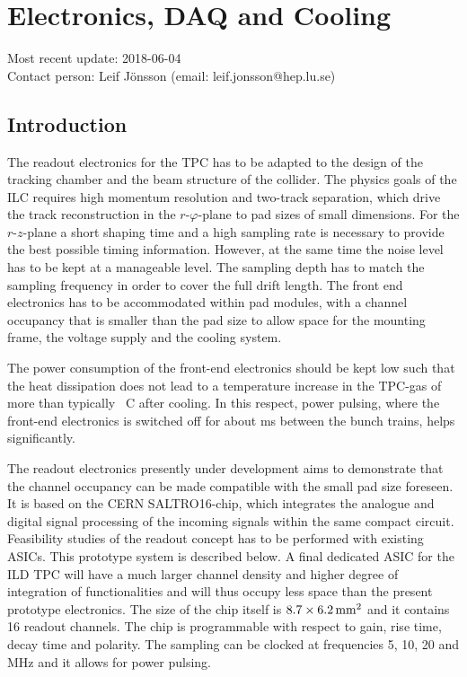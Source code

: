 \section{Electronics, DAQ and Cooling}\label{chap:TPC_sec:electronics}
Most recent update: 2018-06-04 \\
Contact person: Leif J{\"o}nsson (email: leif.jonsson@hep.lu.se)

\subsection{Introduction}
The readout electronics for the TPC has to be adapted to the design of the tracking chamber and the beam structure of the collider. The physics goals of the ILC requires high momentum resolution and two-track separation, which drive the track reconstruction in the $r\text{-}\varphi$-plane to pad sizes of small dimensions. For the $r\text{-}z$-plane a short shaping time and a high sampling rate is necessary to provide the best possible timing information. However, at the same time the noise level has to be kept at a manageable level. The sampling depth has to match the sampling frequency in order to cover the full drift length. The front end electronics has to be accommodated within pad modules, with a channel occupancy that is smaller than the pad size to allow space for the mounting frame, the voltage supply and the cooling system.

The power consumption of the front-end electronics should be kept low such that the heat dissipation does not lead to a temperature increase in the TPC-gas of more than typically \unit[1]{\textdegree C} after cooling. In this respect, power pulsing, where the front-end electronics is switched off for about \unit[199]{ms} between the bunch trains, helps significantly.

The readout electronics presently under development aims to demonstrate that the channel occupancy can be made compatible with the small pad size foreseen. It is based on the CERN SALTRO16-chip, which integrates the analogue and digital signal processing of the incoming signals within the same compact circuit. Feasibility studies of the readout concept has to be performed with existing ASICs. This prototype system is described below. A final dedicated ASIC for the ILD TPC will have a much larger channel density and higher degree of integration of functionalities and will thus occupy less space than the present prototype electronics. The size of the chip itself is $8.7 \times \unit[6.2]{mm^2}$ and it contains 16 readout channels. The chip is programmable with respect to gain, rise time, decay time and polarity. The sampling can be clocked at frequencies 5, 10, 20 and \unit[40]{MHz} and it allows for power pulsing.

